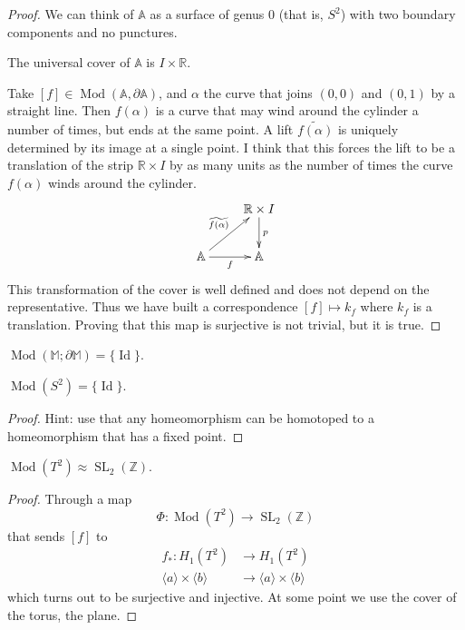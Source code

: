 \begin{proof}
We can think of $\mathbb{A}$ as a
surface of genus $0$ (that is, $S^2$)
with two boundary components and no
punctures.

The universal cover of $\mathbb{A}$ is
$I\times\mathbb{R}$.

Take
$[f]\in\operatorname{Mod}
(\mathbb{A},\partial\mathbb{A})$,
and $\alpha$ the curve that joins
$(0,0)$ and $(0,1)$ by a straight line.
Then $f(\alpha)$ is a curve that may
wind around the cylinder a number of
times, but ends at the same point. A
lift $\widetilde{f(\alpha)}$ is uniquely
determined by its image at a single
point. I think that this forces the lift
to be a translation of the strip
$\mathbb{R}\times I$ by as many units as
the number of times the curve
$f(\alpha)$ winds around the cylinder.
$$
\xymatrix{
  & \mathbb{R}\times I \ar[d]^{p} \\
\mathbb{A}
  \ar[ur]^{\widetilde{f(\alpha)}}
  \ar[r]_{f}
  & \mathbb{A}
}
$$
This transformation of the cover is well
defined and does not depend on the
representative. Thus we have built a
correspondence $[f]\mapsto k_f$ where
$k_f$ is a translation. Proving that
this map is surjective is not trivial,
but it is true.
\end{proof}

\begin{example}
\label{example-mod-mobius}
$\operatorname{Mod}
(\mathbb{M};\partial\mathbb{M})
=\{\operatorname{Id}\}$.
\end{example}

\begin{example}
\label{example-mod-sphere}
$\operatorname{Mod}(S^2)
=\{\operatorname{Id}\}$.
\end{example}

\begin{proof}
Hint: use that any homeomorphism can be
homotoped to a homeomorphism that has a
fixed point.
\end{proof}

\begin{example}
\label{example-mod-torus}
$\operatorname{Mod}(T^2)\approx
\operatorname{SL}_2(\mathbb{Z})$.
\end{example}

\begin{proof}
Through a map
$$
\Phi:\operatorname{Mod}(T^2)\to
\operatorname{SL}_2(\mathbb{Z})
$$
that sends $[f]$ to
$$
\begin{aligned}
f_*:H_1(T^2)&\to H_1(T^2)\\
\langle a\rangle\times\langle b\rangle
&\to
\langle a\rangle\times\langle b\rangle
\end{aligned}
$$
which turns out to be surjective and
injective. At some point we use the
cover of the torus, the plane.
\end{proof}

